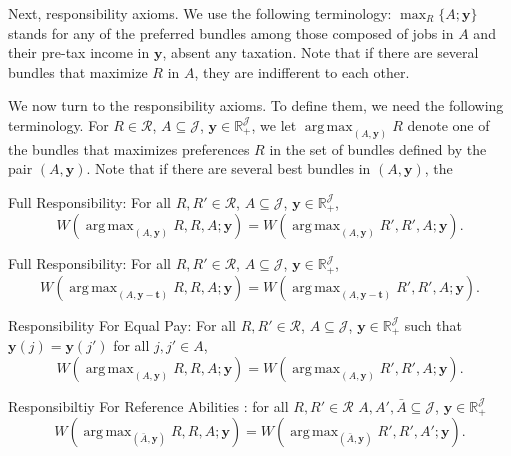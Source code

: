 \documentclass[12pt]{article}
\DeclareMathOperator*{\argmax}{arg\,max}
\begin{document}
Next, responsibility axioms. We use the following terminology: $\max_{R}\{A;\mathbf{y}\}$ stands for any of the preferred bundles among those composed of jobs in $A$ and their pre-tax income in $\mathbf{y}$, absent any taxation. Note that if there are several bundles that maximize $R$ in $A$, they are indifferent to each other.

We now turn to the responsibility axioms. To define them, we need the following terminology. For $R\in \mathcal{R}$, $A\subseteq \mathcal{J}$, $\mathbf{y} \in \mathbb{R}_{+}^{\mathcal{J}}$, we let $\argmax_{(A,\mathbf{y})}R$ denote one of the bundles that maximizes preferences $R$ in the set of bundles defined by the pair $(A,\mathbf{y})$. Note that if there are several best bundles in $(A,\mathbf{y})$, the

Full Responsibility: For all $R,R'\in \mathcal{R}$, $A\subseteq \mathcal{J}$, $\mathbf{y} \in \mathbb{R}_{+}^{\mathcal{J}}$, 
\begin{equation*}
\label{ }
W(\argmax_{(A,\mathbf{y})}R,R,A;\mathbf{y})=W(\argmax_{(A,\mathbf{y})}R',R',A;\mathbf{y}).
\end{equation*}

{ \color{red} 

Full Responsibility: For all $R,R'\in \mathcal{R}$, $A\subseteq \mathcal{J}$, $\mathbf{y} \in \mathbb{R}_{+}^{\mathcal{J}}$, 
\begin{equation*}
\label{ }
W(\argmax_{(A,\mathbf{y-t})}R,R,A;\mathbf{y})=W(\argmax_{(A,\mathbf{y -t })}R',R',A;\mathbf{y}).
\end{equation*}

}

Responsibility For Equal Pay: For all $R,R'\in \mathcal{R}$, $A\subseteq \mathcal{J}$, $\mathbf{y} \in \mathbb{R}_{+}^{\mathcal{J}}$ such that $\mathbf{y}(j)=\mathbf{y}(j')$ for all $j,j'\in A$, 
\begin{equation*}
\label{ }
W(\argmax_{(A,\mathbf{y})}R,R,A;\mathbf{y})=W(\argmax_{(A,\mathbf{y})}R',R',A;\mathbf{y}).
\end{equation*}

{
\color{red}
Responsibiltiy For Reference Abilities : for all $R,R' \in \mathcal{R}$ $A,A',\bar A \subseteq \mathcal{J}$, $\mathbf{y} \in \mathbb{R}_{+}^{\mathcal{J}}$
\begin{equation*}
\label{ }
W(\argmax_{(\bar A,\mathbf{y})}R,R,A;\mathbf{y})=W(\argmax_{(\bar A,\mathbf{y})}R',R',A';\mathbf{y}).
\end{equation*}

}
\end{document}
